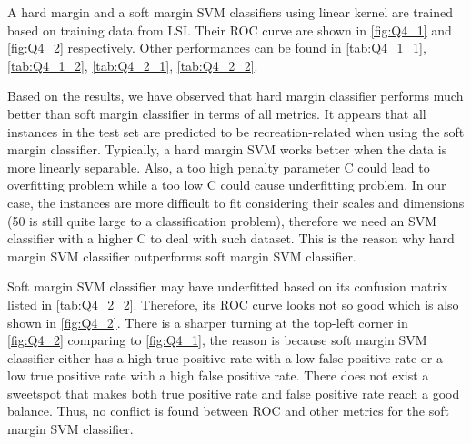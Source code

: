 \documentclass[11pt]{article}
\begin{document}
\begin{table}[h]
\center
\caption{Performances for soft margin SVM (LSI, $\gamma$=0.0001)}
\label{tab:Q4_2_2}
\end{table}

A hard margin and a soft margin SVM classifiers using linear kernel are trained based on training data from LSI. Their ROC curve are shown in \ref{fig:Q4_1} and \ref{fig:Q4_2} respectively. Other performances can be found in \ref{tab:Q4_1_1}, \ref{tab:Q4_1_2}, \ref{tab:Q4_2_1}, \ref{tab:Q4_2_2}.

\bigbreak

Based on the results, we have observed that hard margin classifier performs much better than soft margin classifier in terms of all metrics. It appears that all instances in the test set are predicted to be recreation-related when using the soft margin classifier. Typically, a hard margin SVM works better when the data is more linearly separable. Also, a too high penalty parameter C could lead to overfitting problem while a too low C could cause underfitting problem. In our case, the instances are more difficult to fit considering their scales and dimensions (50 is still quite large to a classification problem), therefore we need an SVM classifier with a higher C to deal with such dataset. This is the reason why hard margin SVM classifier outperforms soft margin SVM classifier.

\bigbreak

Soft margin SVM classifier may have underfitted based on its confusion matrix listed in \ref{tab:Q4_2_2}. Therefore, its ROC curve looks not so good which is also shown in \ref{fig:Q4_2}. There is a sharper turning at the top-left corner in \ref{fig:Q4_2} comparing to \ref{fig:Q4_1}, the reason is because soft margin SVM classifier either has a high true positive rate with a low false positive rate or a low true positive rate with a high false positive rate. There does not exist a sweetspot that makes both true positive rate and false positive rate reach a good balance. Thus, no conflict is found between ROC and other metrics for the soft margin SVM classifier.
\end{document}
